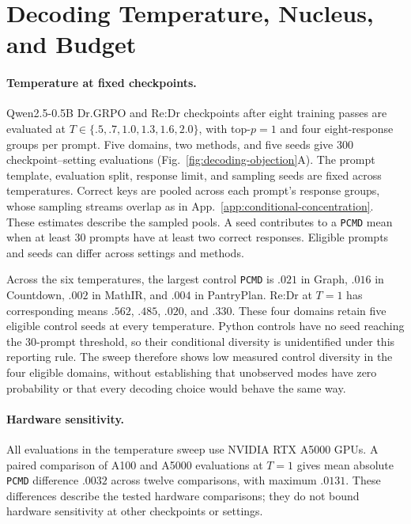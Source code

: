 \documentclass{article}
\newcommand{\1}{\mathbf 1}
\newcommand{\pmd}{\texttt{PCMD}}
\theoremstyle{remark}
\theoremstyle{definition}
\theoremstyle{plain}
\begin{document}
\section{Decoding Temperature, Nucleus, and Budget}
\label{app:decoding-objection}

\paragraph{Temperature at fixed checkpoints.}
Qwen2.5-0.5B Dr.GRPO and Re:Dr checkpoints after eight training passes are
evaluated at $T\in\{.5,.7,1.0,1.3,1.6,2.0\}$, with top-$p=1$ and four
eight-response groups per prompt. Five domains, two methods, and five seeds
give 300 checkpoint--setting evaluations (Fig.~\ref{fig:decoding-objection}A).
The prompt template, evaluation split, response limit, and sampling seeds
are fixed across temperatures. Correct keys are pooled across each prompt's response groups, whose
sampling streams overlap as in App.~\ref{app:conditional-concentration}.
These estimates describe the sampled pools. A seed contributes to a
\pmd{} mean when at least 30 prompts have at least two correct responses. Eligible prompts and seeds
can differ across settings and methods.

Across the six temperatures, the largest control \pmd{} is $.021$ in
Graph, $.016$ in Countdown, $.002$ in MathIR, and $.004$ in PantryPlan.
Re:Dr at $T=1$ has corresponding means $.562$, $.485$, $.020$, and $.330$.
These four domains retain five eligible control seeds at every temperature.
Python controls have no seed reaching the 30-prompt threshold, so their
conditional diversity is unidentified under this reporting rule.
The sweep therefore shows low measured control diversity in the four
eligible domains, without establishing that unobserved modes have zero
probability or that every decoding choice would behave the same way.

\paragraph{Hardware sensitivity.}
All evaluations in the temperature sweep use NVIDIA RTX A5000 GPUs.
A paired comparison of A100 and A5000 evaluations at $T=1$ gives mean
absolute \pmd{} difference $.0032$ across twelve comparisons, with maximum
$.0131$. These differences describe the tested hardware comparisons;
they do not bound hardware sensitivity at other checkpoints or settings.
\end{document}
